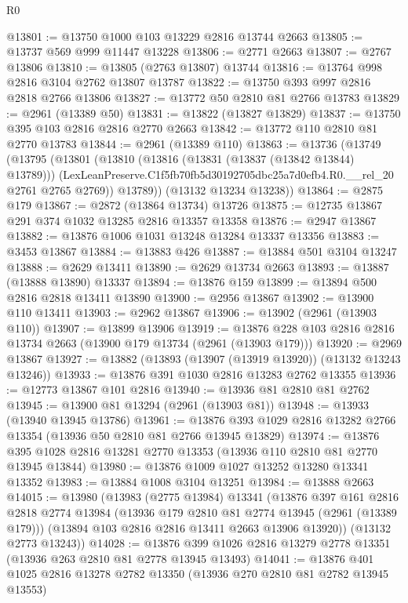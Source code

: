\begin{lexlean}{R0}
\begin{coremodule}
@13801 := @13750 @1000 @103 @13229 @2816 @13744 @2663
@13805 := @13737 @569 @999 @11447 @13228
@13806 := @2771 @2663
@13807 := @2767 @13806
@13810 := @13805 (@2763 @13807) @13744
@13816 := @13764 @998 @2816 @3104 @2762 @13807 @13787
@13822 := @13750 @393 @997 @2816 @2818 @2766 @13806
@13827 := @13772 @50 @2810 @81 @2766 @13783
@13829 := @2961 (@13389 @50)
@13831 := @13822 (@13827 @13829)
@13837 := @13750 @395 @103 @2816 @2816 @2770 @2663
@13842 := @13772 @110 @2810 @81 @2770 @13783
@13844 := @2961 (@13389 @110)
@13863 := @13736
    (@13749
      (@13795
        (@13801
          (@13810
            (@13816 (@13831 (@13837 (@13842 @13844) @13789)))
            (LexLeanPreserve.C1f5fb70fb5d30192705dbc25a7d0efb4.R0.__rel_20 @2761 @2765 @2769))
          @13789))
      (@13132 @13234 @13238))
@13864 := @2875 @179
@13867 := @2872 (@13864 @13734) @13726
@13875 := @12735 @13867 @291 @374 @1032 @13285 @2816 @13357 @13358
@13876 := @2947 @13867
@13882 := @13876 @1006 @1031 @13248 @13284 @13337 @13356
@13883 := @3453 @13867
@13884 := @13883 @426
@13887 := @13884 @501 @3104 @13247
@13888 := @2629 @13411
@13890 := @2629 @13734 @2663
@13893 := @13887 (@13888 @13890) @13337
@13894 := @13876 @159
@13899 := @13894 @500 @2816 @2818 @13411 @13890
@13900 := @2956 @13867
@13902 := @13900 @110 @13411
@13903 := @2962 @13867
@13906 := @13902 (@2961 (@13903 @110))
@13907 := @13899 @13906
@13919 := @13876 @228 @103 @2816 @2816 @13734 @2663 (@13900 @179 @13734 (@2961 (@13903 @179)))
@13920 := @2969 @13867
@13927 := @13882 (@13893 (@13907 (@13919 @13920)) (@13132 @13243 @13246))
@13933 := @13876 @391 @1030 @2816 @13283 @2762 @13355
@13936 := @12773 @13867 @101 @2816
@13940 := @13936 @81 @2810 @81 @2762
@13945 := @13900 @81 @13294 (@2961 (@13903 @81))
@13948 := @13933 (@13940 @13945 @13786)
@13961 := @13876 @393 @1029 @2816 @13282 @2766 @13354 (@13936 @50 @2810 @81 @2766 @13945 @13829)
@13974 := @13876 @395 @1028 @2816 @13281 @2770 @13353 (@13936 @110 @2810 @81 @2770 @13945 @13844)
@13980 := @13876 @1009 @1027 @13252 @13280 @13341 @13352
@13983 := @13884 @1008 @3104 @13251
@13984 := @13888 @2663
@14015 := @13980
    (@13983
      (@2775 @13984)
      @13341
      (@13876
        @397
        @161
        @2816
        @2818
        @2774
        @13984
        (@13936 @179 @2810 @81 @2774 @13945 (@2961 (@13389 @179)))
        (@13894 @103 @2816 @2816 @13411 @2663 @13906 @13920))
      (@13132 @2773 @13243))
@14028 := @13876 @399 @1026 @2816 @13279 @2778 @13351 (@13936 @263 @2810 @81 @2778 @13945 @13493)
@14041 := @13876 @401 @1025 @2816 @13278 @2782 @13350 (@13936 @270 @2810 @81 @2782 @13945 @13553)

\end{coremodule}
\end{lexlean}

